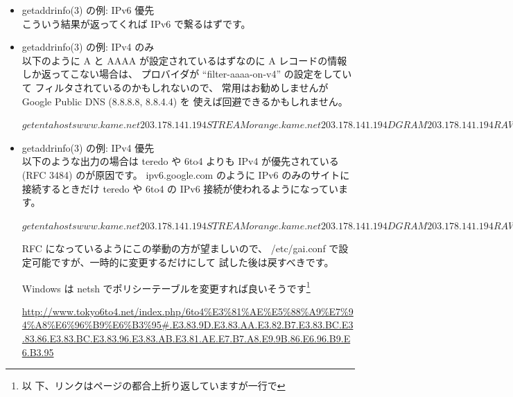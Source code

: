 \documentclass[mingoth,a4paper]{jsarticle}
\begin{document}
\begin{itemize}

\item getaddrinfo(3) の例: IPv6 優先\\
こういう結果が返ってくれば IPv6 で繋るはずです。



\item getaddrinfo(3) の例: IPv4 のみ\\
以下のように A と AAAA が設定されているはずなのに
A レコードの情報しか返ってこない場合は、
プロバイダが ``filter-aaaa-on-v4'' の設定をしていて
フィルタされているのかもしれないので、
常用はお勧めしませんが
Google Public DNS (8.8.8.8, 8.8.4.4) を
使えば回避できるかもしれません。

\begin{commandline}
$ getent ahosts www.kame.net
203.178.141.194 STREAM orange.kame.net
203.178.141.194 DGRAM
203.178.141.194 RAW
$
\end{commandline}


\item getaddrinfo(3) の例: IPv4 優先\\
以下のような出力の場合は
teredo や 6to4 よりも IPv4 が優先されている (RFC 3484)
のが原因です。
ipv6.google.com のように IPv6 のみのサイトに接続するときだけ
teredo や 6to4 の IPv6 接続が使われるようになっています。

\begin{commandline}
$ getent ahosts www.kame.net
203.178.141.194 STREAM orange.kame.net
203.178.141.194 DGRAM
203.178.141.194 RAW
2001:200:dff:fff1:216:3eff:feb1:44d7 STREAM
2001:200:dff:fff1:216:3eff:feb1:44d7 DGRAM
2001:200:dff:fff1:216:3eff:feb1:44d7 RAW
$
\end{commandline}

RFC になっているようにこの挙動の方が望ましいので、
/etc/gai.conf で設定可能ですが、一時的に変更するだけにして
試した後は戻すべきです。

Windows は netsh でポリシーテーブルを変更すれば良いそうです\footnote{以
      下、リンクはページの都合上折り返していますが一行で}

\url{http://www.tokyo6to4.net/index.php/6to4%E3%81%AE%E5%88%A9%E7%94%A8%E6%96%B9%E6%B3%95#.E3.83.9D.E3.83.AA.E3.82.B7.E3.83.BC.E3.83.86.E3.83.BC.E3.83.96.E3.83.AB.E3.81.AE.E7.B7.A8.E9.9B.86.E6.96.B9.E6.B3.95}


\end{itemize}
\end{document}
